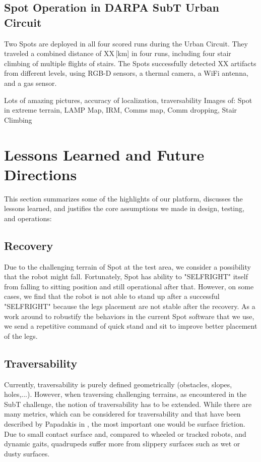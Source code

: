 \documentclass[a4paper, 10pt, conference]{ieeeconf}      %
\newcommand{\inst}[1]{{\color{orange} #1 }} %
\begin{document}
\subsection{Spot Operation in DARPA SubT Urban Circuit}

Two Spots are deployed in all four scored runs during the Urban Circuit. They traveled a combined distance of XX\,[km] in four runs, including four stair climbing of multiple flights of stairs. The Spots successfully detected XX artifacts from different levels, using RGB-D sensors, a thermal camera, a WiFi antenna, and a gas sensor. 

\inst{Lots of amazing pictures, accuracy of localization, traversability
Images of: Spot in extreme terrain, LAMP Map, IRM, Comms map, Comm dropping, Stair Climbing}

\newpage

\section{Lessons Learned and Future Directions}\label{sec:conclusion}
This section summarizes some of the highlights of our platform,
discusses the lessons learned, and justifies the core
assumptions we made in design, testing, and operations:

\subsection{Recovery}
Due to the challenging terrain of Spot at the test area, we consider a possibility that the robot might fall.
%
Fortunately, Spot has ability to "SELFRIGHT" itself from falling to sitting position and still operational after that.
%
However, on some cases, we find that the robot is not able to stand up after a successful "SELFRIGHT" because the legs placement are not stable after the recovery.
%
As a work around to robustify the behaviors in the current Spot software that we use, we send a repetitive command of quick stand and sit to improve better placement of the legs.

\subsection{Traversability}
Currently, traversability is purely defined geometrically (obstacles, slopes, holes,...).
However, when traversing challenging terrains, as encountered in the SubT challenge, the notion of traversability has to be extended.
While there are many metrics, which can be considered for traversability and that have been described by Papadakis in \cite{Papadakis2013}, the most important one would be surface friction.
Due to small contact surface and, compared to wheeled or tracked robots, and dynamic gaits, quadrupeds suffer more from slippery surfaces such as wet or dusty surfaces. 
\end{document}
